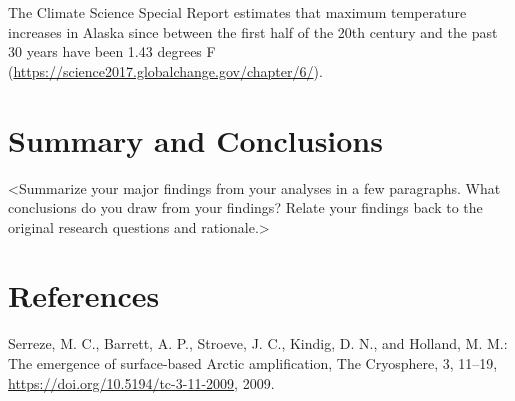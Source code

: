 \documentclass[12pt,]{article}
\begin{document}
The Climate Science Special Report estimates that maximum temperature
increases in Alaska since between the first half of the 20th century and
the past 30 years have been 1.43 degrees F
(\url{https://science2017.globalchange.gov/chapter/6/}).

\newpage

\hypertarget{summary-and-conclusions}{%
\section{Summary and Conclusions}\label{summary-and-conclusions}}

\textless{}Summarize your major findings from your analyses in a few
paragraphs. What conclusions do you draw from your findings? Relate your
findings back to the original research questions and
rationale.\textgreater{}

\newpage

\hypertarget{references}{%
\section{References}\label{references}}

 Serreze, M. C., Barrett, A. P., Stroeve, J. C., Kindig, D. N., and
Holland, M. M.: The emergence of surface-based Arctic amplification, The
Cryosphere, 3, 11--19, \url{https://doi.org/10.5194/tc-3-11-2009}, 2009.
\end{document}
